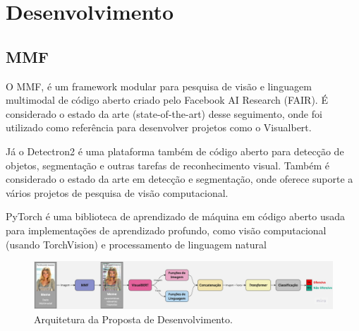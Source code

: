 \chapter{Desenvolvimento}
\label{cap:03}

\section{MMF}

O MMF, é um framework modular para pesquisa de visão e linguagem multimodal de código aberto criado pelo Facebook AI Research (FAIR). É considerado o estado da arte (state-of-the-art) desse seguimento, onde foi utilizado como referência para desenvolver projetos como o Visualbert.

Já o Detectron2 é uma plataforma também de código aberto para detecção de objetos, segmentação e outras tarefas de reconhecimento visual. Também é considerado o estado da arte em detecção e segmentação, onde oferece suporte a vários projetos de pesquisa de visão computacional.

PyTorch é uma biblioteca de aprendizado de máquina em código aberto usada para implementações de aprendizado profundo, como visão computacional (usando TorchVision) e processamento de linguagem natural

\begin{figure}[!htbp]
	\centering
	\includegraphics[scale=0.18]{imagens/diagrama.jpeg}
    \caption {Arquitetura da Proposta de Desenvolvimento.}
\end{figure}
